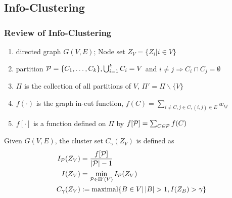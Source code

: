 \documentclass[notheorems]{beamer}
\begin{document}
\subsection{Info-Clustering}
\begin{frame}
\frametitle{Review of Info-Clustering}
\begin{enumerate}
\item directed graph $G(V, E)$; Node set $Z_V=\{Z_i | i \in V\}$
\item partition $\P=\{C_1, \dots, C_k\}, \bigcup_{i=1}^k C_i = V$ and $i\neq j \Rightarrow C_i \cap C_j = \emptyset$
\item $\Pi$ is the collection of all partitions of $V$, $\Pi' = \Pi \backslash \{V\}$
\item $f(\cdot)$ is the graph in-cut function, $f(C)=\sum_{i \neq C, j\in C, (i,j) \in E} w_{ij}$
\item $f[\cdot]$ is a function defined on $\Pi$ by $f[\P]=\sum_{C\in \P}f(C)$
\end{enumerate}
\begin{definition}
Given $G(V, E)$, the cluster set $C_{\gamma}(Z_V)$ is defined as 
\begin{align}
I_{\mathcal{P}}(Z_V) & = \frac{f[\P]}{ \abs{\mathcal{P}} - 1}\\
I(Z_V) & = \min_{\mathcal{P} \in \Pi'(V)} I_{\mathcal{P}}(Z_V) \\
C_{\gamma}(Z_V) & := \textrm{maximal}\{ B \in V \vert \, \abs{B} > 1, I(Z_B) > \gamma \}
\end{align}
\end{definition}
\end{frame}
\end{document}
